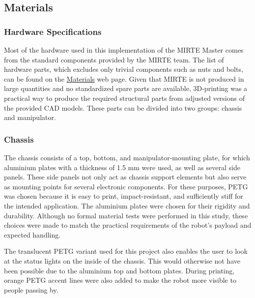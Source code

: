 \subsection{Materials}

    \subsubsection{Hardware Specifications}

    Most of the hardware used in this implementation of the MIRTE Master comes from the standard components provided by the MIRTE team. The list of hardware parts, which excludes only trivial components such as nuts and bolts, can be found on the \href{https://matt-rbt.github.io/Lab-Cleanup-Robot-using-the-Mirte-Master-Platform/materials/}{Materials} web page. Given that MIRTE is not produced in large quantities and no standardized spare parts are available, 3D-printing was a practical way to produce the required structural parts from adjusted versions of the provided CAD models. These parts can be divided into two groups: chassis and manipulator.
    

    \subsubsection{Chassis}
    
    The chassis consists of a top, bottom, and manipulator-mounting plate, for which aluminium plates with a thickness of 1.5 mm were used, as well as several side panels. These side panels not only act as chassis support elements but also serve as mounting points for several electronic components. For these purposes, PETG was chosen because it is easy to print, impact-resistant, and sufficiently stiff for the intended application. The aluminium plates were chosen for their rigidity and durability. Although no formal material tests were performed in this study, these choices were made to match the practical requirements of the robot's payload and expected handling. \newline
    
    The translucent PETG variant used for this project also enables the user to look at the status lights on the inside of the chassis. This would otherwise not have been possible due to the aluminium top and bottom plates. During printing, orange PETG accent lines were also added to make the robot more visible to people passing by.
